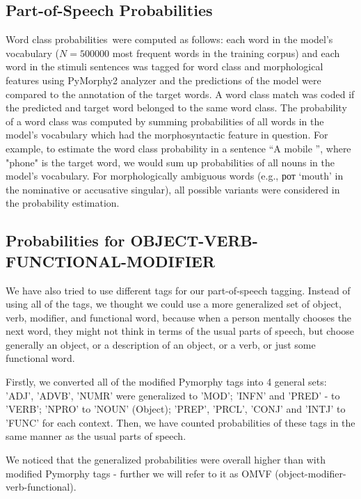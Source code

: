 \documentclass[a4paper]{article}
\begin{document}
\subsection{Part-of-Speech Probabilities}

Word class probabilities were computed as follows: each word in the model’s vocabulary (\(N = 500000\) most frequent words in the training corpus) and each word in the stimuli sentences was tagged for word class and morphological features using PyMorphy2 analyzer 
\cite{korobov:2015} and the predictions of the model were compared to the annotation of the target words. A word class match was coded if the predicted and target word belonged to the same word class. The probability of a word class was computed by summing probabilities of all words in the model’s vocabulary which had the morphosyntactic feature in question. For example, to estimate the word class probability in a sentence “A mobile \underline{\hspace{1em}}”, where "phone" is the target word, we would sum up probabilities of all nouns in the model’s vocabulary. For morphologically ambiguous words (e.g., рот ‘mouth’ in the nominative or accusative singular), all possible variants were considered in the probability estimation.

\subsection{Probabilities for OBJECT-VERB-FUNCTIONAL-MODIFIER}

We have also tried to use different tags for our part-of-speech tagging. Instead of using all of the tags, we thought we could use a more generalized set of object, verb, modifier, and functional word, because when a person mentally chooses the next word, they might not think in terms of the usual parts of speech, but choose generally an object, or a description of an object, or a verb, or just some functional word.

Firstly, we converted all of the modified Pymorphy tags into 4 general sets: 'ADJ', 'ADVB', 'NUMR' were generalized to 'MOD'; 'INFN' and 'PRED' - to 'VERB'; 'NPRO' to 'NOUN' (Object); 'PREP', 'PRCL', 'CONJ' and 'INTJ' to 'FUNC' for each context. Then, we have counted probabilities of these tags in the same manner as the usual parts of speech. 

We noticed that the generalized probabilities were overall higher than with modified Pymorphy tags - further we will refer to it as OMVF (object-modifier-verb-functional).
\end{document}

